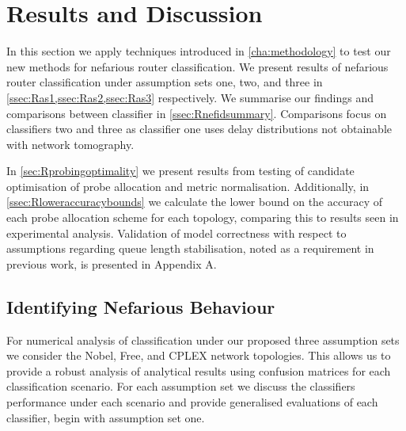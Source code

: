 \chapter{Results and Discussion}
\label{cha:result}
In this section we apply techniques introduced in \cref{cha:methodology} to test our new methods for nefarious router classification. We present results of nefarious router classification under assumption sets one, two, and three in \cref{ssec:Ras1,ssec:Ras2,ssec:Ras3} respectively. We summarise our findings and comparisons between classifier in \cref{ssec:Rnefidsummary}. Comparisons focus on classifiers two and three as classifier one uses delay distributions not obtainable with network tomography.\par
In \cref{sec:Rprobingoptimality} we present results from testing of candidate optimisation of probe allocation and metric normalisation. Additionally, in \cref{ssec:Rloweraccuracybounds} we calculate the lower bound on the accuracy of each probe allocation scheme for each topology, comparing this to results seen in experimental analysis. Validation of model correctness with respect to assumptions regarding queue length stabilisation, noted as a requirement in previous work, is presented in Appendix A.

\section{Identifying Nefarious Behaviour}
\label{sec:Rnefarouterdetection}
For numerical analysis of classification under our proposed three assumption sets we consider the Nobel, Free, and CPLEX network topologies. This allows us to provide a robust analysis of analytical results using confusion matrices for each classification scenario. For each assumption set we discuss the classifiers performance under each scenario and provide generalised evaluations of each classifier, begin with assumption set one.

